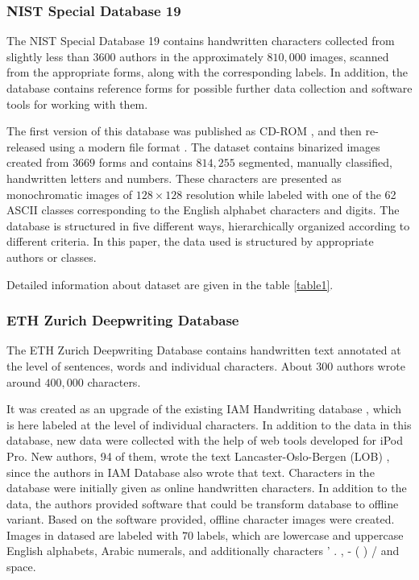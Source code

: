 \documentclass{article}
\begin{document}
\subsubsection{NIST Special Database 19}

The NIST Special Database 19 \citet{nist} contains handwritten characters collected from slightly less than $3600$ authors in the approximately $810,000$ images, 
scanned from the appropriate forms, along with the corresponding labels. 
In addition, the database contains reference forms for possible further data collection and software tools for working with them. 

The first version of this database was published as CD-ROM \citet{nistv0}, and then re-released using a modern file format \citet{nist}. 
The dataset contains binarized images created from $3669$ forms and contains $814,255$ segmented, manually classified, handwritten letters and numbers. 
These characters are presented as monochromatic images of $128 \times 128$ resolution while labeled with one of the 62 ASCII classes corresponding to the English alphabet characters and digits. 
The database is structured in five different ways, hierarchically organized according to different criteria. 
In this paper, the data used is structured by appropriate authors or classes. 

Detailed information about dataset are given in the table \ref{table1}.  

\subsubsection{ETH Zurich Deepwriting Database}

The ETH Zurich Deepwriting Database\cite{deepwriting} contains handwritten text annotated at the level of sentences, words and individual characters. 
About $300$ authors wrote around $400,000$ characters. 

It was created as an upgrade of the existing IAM Handwriting database \citet{iam}, which is here labeled at the level of individual characters. 
In addition to the data in this database, new data were collected with the help of web tools developed for iPod Pro. 
New authors, 94 of them, wrote the text Lancaster-Oslo-Bergen (LOB) \citet{lob}, since the authors in IAM Database also wrote that text. 
Characters in the database were initially given as online handwritten characters. 
In addition to the data, the authors provided software that could be transform database to offline variant. 
Based on the software provided, offline character images were created. 
Images in datased are labeled with $70$ labels, which are lowercase and uppercase English alphabets, Arabic numerals, and additionally characters 
' . , - ( ) / and space. 
\end{document}
